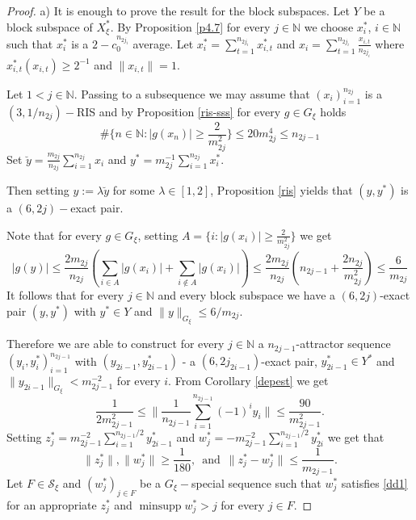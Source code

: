 \documentclass[a4paper]{amsart}
\theoremstyle{plain}
\newcommand{\N}{\mathbb{N}}
\newcommand{\mc}{\mathcal}
\newcommand{\norm}[1][\cdot]{\lVert #1\rVert}
\DeclareMathOperator{\minsupp}{minsupp}
\begin{document}
\begin{proof}
a) It is enough to prove the result for the block subspaces. Let
$Y$ be a block subspace of $X_\xi^{*}$. By Proposition \ref{p4.7}
for every $j\in\N$ we choose $x_{i}^{*}$, $i\in\N$  such that
$x^{*}_{i}$ is a $2-c_{0}^{n_{2j_i}}$ average. Let
$x^*_{i}=\sum_{t=1}^{n_{2j_i}}x_{i,t}^{*}$ and
$x_{i}=\sum_{t=1}^{n_{2j_i}}\frac{x_{i,t}}{n_{2j_i}}$ where
$x^{*}_{i,t}(x_{i,t})\geq 2^{-1}$ and $\norm[x_{i,t}]=1$.

Let $1<j\in\N$. Passing to a subsequence we may assume that
$(x_{i})_{i=1}^{n_{2j}}$ is a $(3,1/n_{2j})-$RIS and by Proposition \ref{ris-sss} for every
$g\in G_{\xi}$ holds
$$
\#\{n\in\N: \vert g(x_n)\vert\geq \frac{2}{m_{2j}^2}\}\leq
20m_{2j}^{4}\leq n_{2j-1}
$$
Set $\breve{y}=\frac{m_{2j}}{n_{2j}}\sum_{i=1}^{n_{2j}}x_{i}$ and
$y^{*}=m_{2j}^{-1}\sum_{i=1}^{n_{2j}}x_{i}^{*}$.

Then setting $y:=\lambda \breve{y}$ for some $\lambda\in [1,2]$,
Proposition \ref{ris} yields that $(y,y^{*})$ is a
$(6,2j)-$exact pair.

Note that for every  $g\in G_{\xi}$, setting $A=\{i:\vert
g(x_i)\vert\geq \frac{2}{m_{2j}^{2}}\}$ we get
\begin{equation}\label{6}
\vert g(y)\vert
\leq
\frac{2m_{2j}}{n_{2j}} ( \sum_{i\in
A}\vert g(x_i)\vert+\sum_{i\not\in A}\vert g(x_i)\vert)
\leq
\frac{2m_{2j}}{n_{2j}} (n_{2j-1}+\frac{2n_{2j}}{m_{2j}^{2}})\leq
\frac{6}{m_{2j}}
\end{equation}
It follows that for every $j\in\N$ and  every block subspace we have a $(6,2j)$-exact
pair $(y,y^*)$ with $y^*\in Y$ and $\norm[y]_{G_{\xi}}\leq 6/m_{2j}$.


Therefore we are able to construct for every $j\in\N$ a $n_{2j-1}$-attractor sequence
$(y_{i},y_{i}^{*})_{i=1}^{n_{2j-1}}$ with $(y_{2i-1},y^{*}_{2i-1})$ - a
$(6,2j_{2i-1})$-exact pair, $y_{2i-1}^*\in Y^*$ and
$\norm[y_{2i-1}]_{G_{\xi}}<m_{2j-1}^{-2}$ for every $i$. From Corollary  \ref{depest} we
get
$$
\frac{1}{2m_{2j-1}^{2}}\leq
\|\frac{1}{n_{2j-1}}\sum_{i=1}^{n_{2j-1}}(-1)^iy_{i}\|\leq
\frac{90}{m_{2j-1}^{2}}.
$$
Setting
$z_{j}^{*}=m_{2j-1}^{-2}\sum_{i=1}^{n_{2j-1}/2}y_{2i-1}^{*}$ and
$w_{j}^{*}=-m_{2j-1}^{-2}\sum_{i=1}^{n_{2j-1}/2}y_{2i}^{*}$ we get
that
\begin{equation}\label{dd1}
\norm[z_{j}^{*}],\norm[w_{j}^{*}]\geq
\frac{1}{180},\,\,\,\textrm{and}\,\,\,\norm[z^{*}_{j}-w^{*}_{j}]\leq
\frac{1}{m_{2j-1}}.
\end{equation}
Let $F\in\mc{S}_{\xi}$ and $(w_{j}^{*})_{j\in F}$ be a $G_{\xi}-$special
sequence such that $w_j^*$ satisfies \eqref{dd1} for an
appropriate $z_{j}^{*}$ and $\minsupp w_j^*>j$ for every $j\in F$.


\end{proof}
\end{document}
